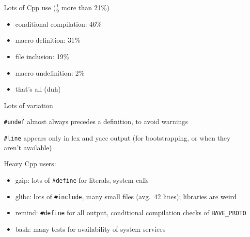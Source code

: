 \documentclass{slides}
\makeatletter
\def\tinytiberius{\raisebox{-.1in}{\mbox{\epsfig{file=tiberius-coin.eps,height=.5in}}}}
\def\tinycaligula{\raisebox{-.1in}{\mbox{\epsfig{file=caligula-coin.eps,height=.5in}}}}
\def\slidetitle#1{\begin{center}\tinytiberius \hfill {\large #1} \hfill
    \tinycaligula \end{center} \vspace{-.4in} \strut\hrulefill\strut}
\def\nopgbrk{\@nobreaktrue}
\makeatother
\begin{document}
\begin{note}
\small

Lots of Cpp use ($\frac{1}{9}$ more than 21\%)
\begin{itemize}\itemsep 0pt \parskip 0pt
 \item conditional compilation: 46\%
 \item macro definition: 31\%
 \item file inclusion: 19\%
 \item macro undefinition: 2\%
 \item that's all (duh)
\end{itemize}

Lots of variation

{\tt \#undef} almost always precedes a definition, to avoid warnings

{\tt \#line} appears only in lex and yacc output (for bootstrapping, or
when they aren't available)

Heavy Cpp users:
\begin{itemize}\itemsep 0pt \parskip 0pt
\item gzip: lots of {\tt \#define} for literals, system calls
\item glibc: lots of {\tt \#include}, many small files (avg.~42 lines);
  libraries are weird
\item remind: {\tt \#define} for all output,
  conditional compilation checks of \verb|HAVE_PROTO|
\item bash: many tests for availability of system services
\end{itemize}
\end{note}


% 
\end{document}
